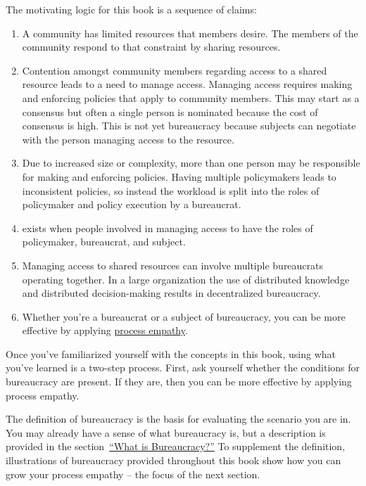 The motivating logic for this book is a sequence of claims:
\begin{enumerate}
    \item A community has limited resources that members desire. The members of the community respond to that constraint by sharing resources.
    \item Contention amongst community members regarding access to a \gls{shared resource} leads to a need to manage access.  
    \iftoggle{glossaryinmargin}{\marginpar{[Glossary]}}{}%
    Managing access requires making and enforcing policies that apply to community members. This may start as a consensus but often a single person is nominated because the cost of consensus is high. This is not yet bureaucracy because subjects can negotiate with the person managing access to the resource.
    \item Due to increased size or complexity, more than one person may be responsible for making and enforcing policies. Having multiple policymakers leads to inconsistent policies, so instead the workload is split into the roles of policymaker and policy execution by a bureaucrat. 
    \item 
\iftoggle{glossarysubstitutionworks}{\Gls{bureaucracy}}{Bureaucracy}
exists when people involved in managing access to 
\iftoggle{glossarysubstitutionworks}{\glspl{shared resource}}{shared resources} have the roles of policymaker, bureaucrat, and subject.
    \item Managing access to shared resources can involve multiple bureaucrats operating together. In a large organization the use of distributed knowledge and distributed decision-making results in \gls{decentralized bureaucracy}.
    \item Whether you're a \gls{bureaucrat} 
    \iftoggle{glossaryinmargin}{\marginpar{[Glossary]}}{}%
    or a subject of bureaucracy, you can be more effective by applying \hyperref[sec:process-empathy]{process empathy}.
\end{enumerate}

Once you've familiarized yourself with the concepts in this book, using what you've learned is a two-step process. First, ask yourself whether the conditions for bureaucracy are present. If they are, then you can be more effective by applying process empathy.

The definition of bureaucracy is the basis for evaluating the scenario you are in. You may already have a sense of what bureaucracy is, but a description 
is provided\iftoggle{haspagenumbers}{ on page~\pageref{sec:define-bureaucracy}}{} 
in the section~\hyperref[sec:define-bureaucracy]{``What is Bureaucracy?''} To supplement the definition, illustrations of bureaucracy provided throughout this book show how you can grow your process empathy -- the focus of the next section. 